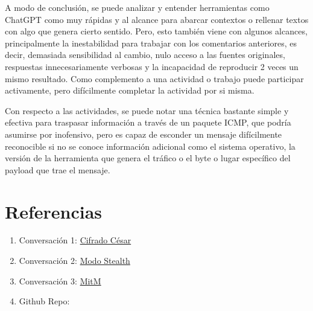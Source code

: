 \documentclass[letter,12pt]{article}
\begin{document}
A modo de conclusión, se puede analizar y entender herramientas como ChatGPT como muy rápidas y al alcance para abarcar contextos o rellenar textos con algo que genera cierto sentido. Pero, esto también viene con algunos alcances, principalmente la inestabilidad para trabajar con los comentarios anteriores, es decir, demasiada sensibilidad al cambio, nulo acceso a las fuentes originales, respuestas innecesariamente verbosas y la incapacidad de reproducir 2 veces un mismo resultado. Como complemento a una actividad o trabajo puede participar activamente, pero difícilmente completar la actividad por si misma.

Con respecto a las actividades, se puede notar una técnica bastante simple y efectiva para traspasar información a través de un paquete ICMP, que podría asumirse por inofensivo, pero es capaz de esconder un mensaje difícilmente reconocible si no se conoce información adicional como el sistema operativo, la versión de la herramienta que genera el tráfico o el byte o lugar específico del payload que trae el mensaje.

\section{Referencias}
\begin{enumerate}
\renewcommand*\labelenumi{[\theenumi]}
  \item Conversación 1: \href{https://chat.openai.com/share/67db6704-737c-4e4b-b40f-d29987e349b3}{Cifrado César}
  \item Conversación 2: \href{https://chat.openai.com/share/48196809-29e2-4f22-9135-8f3fe4940514}{Modo Stealth}
  \item Conversación 3: \href{https://chat.openai.com/share/2c09bc6e-27e3-4291-8112-c15819ce67e5}{MitM}
  \item Github Repo:
\end{enumerate}
\end{document}
